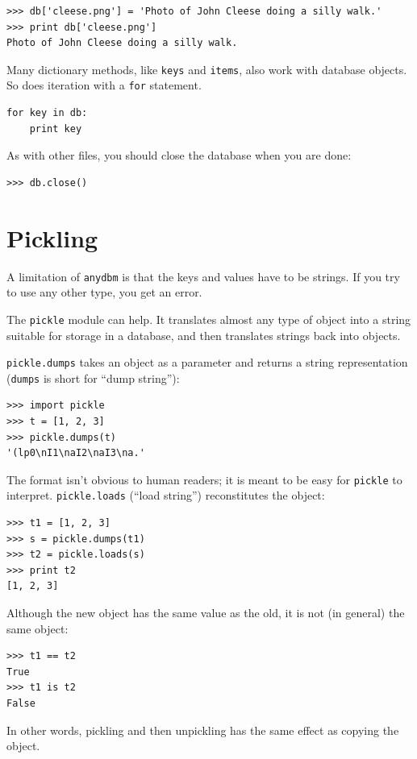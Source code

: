 \documentclass[10pt]{book}
\begin{document}
\begin{verbatim}
>>> db['cleese.png'] = 'Photo of John Cleese doing a silly walk.'
>>> print db['cleese.png']
Photo of John Cleese doing a silly walk.
\end{verbatim}
%
Many dictionary methods, like {\tt keys} and {\tt items}, also
work with database objects.  So does iteration with a {\tt for}
statement.

\begin{verbatim}
for key in db:
    print key
\end{verbatim}
%
As with other files, you should close the database when you are
done:

\begin{verbatim}
>>> db.close()
\end{verbatim}
%


\section{Pickling}

A limitation of {\tt anydbm} is that the keys and values have
to be strings.  If you try to use any other type, you get an
error.

The {\tt pickle} module can help.  It translates
almost any type of object into a string suitable for storage in a
database, and then translates strings back into objects.

{\tt pickle.dumps} takes an object as a parameter and returns
a string representation ({\tt dumps} is short for ``dump string''):

\begin{verbatim}
>>> import pickle
>>> t = [1, 2, 3]
>>> pickle.dumps(t)
'(lp0\nI1\naI2\naI3\na.'
\end{verbatim}
%
The format isn't obvious to human readers; it is meant to be
easy for {\tt pickle} to interpret.  {\tt pickle.loads}
(``load string'') reconstitutes the object:

\begin{verbatim}
>>> t1 = [1, 2, 3]
>>> s = pickle.dumps(t1)
>>> t2 = pickle.loads(s)
>>> print t2
[1, 2, 3]
\end{verbatim}
%
Although the new object has the same value as the old, it is
not (in general) the same object:

\begin{verbatim}
>>> t1 == t2
True
>>> t1 is t2
False
\end{verbatim}
%
In other words, pickling and then unpickling has the same effect
as copying the object.
\end{document}
